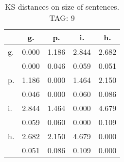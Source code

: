 \begin{table}[h!]
\begin{center}
\begin{tabular}{| l | c | c | c | c |}\hline
 & g. & p. & i. & h. \\\hline
g. & 0.000  & 1.186  & 2.844  & 2.682 \\\hline
 & 0.000  & 0.046  & 0.059  & 0.051 \\\hline
p. & 1.186  & 0.000  & 1.464  & 2.150 \\\hline
 & 0.046  & 0.000  & 0.060  & 0.086 \\\hline
i. & 2.844  & 1.464  & 0.000  & 4.679 \\\hline
 & 0.059  & 0.060  & 0.000  & 0.109 \\\hline
h. & 2.682  & 2.150  & 4.679  & 0.000 \\\hline
 & 0.051  & 0.086  & 0.109  & 0.000 \\\hline
\end{tabular}
\caption{KS distances on size of sentences. TAG: 9}
\end{center}
\end{table}